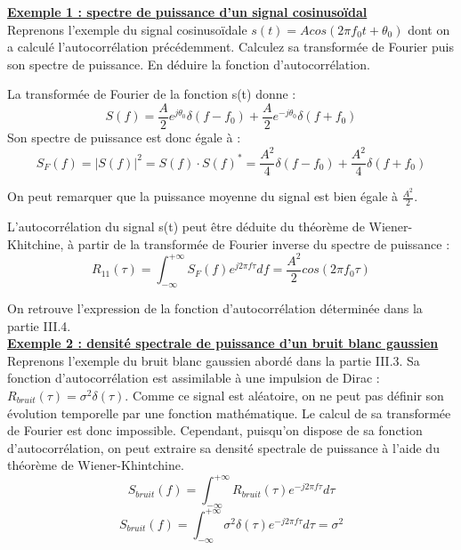 	
	\textbf{\underline{Exemple 1 : spectre de puissance d'un signal cosinusoïdal}} \\
	
	Reprenons l'exemple du signal cosinusoïdale $s(t)=Acos(2\pi f_{0}t+\theta_{0})$ dont on a calculé l'autocorrélation précédemment. Calculez sa transformée de Fourier puis son spectre de puissance. En déduire la fonction d'autocorrélation.
	
	La transformée de Fourier de la fonction s(t) donne :
	\begin{equation*}
	S(f) = \frac{A}{2}e^{j\theta_{0}}\delta(f-f_{0})+\frac{A}{2}e^{-j\theta_{0}}\delta(f+f_{0})
	\end{equation*}
	Son spectre de puissance est donc égale à :
	\begin{equation*}
	S_{F}(f)=|S(f)|^{2}=S(f) \cdot S(f)^{*}=\frac{A^{2}}{4}\delta(f-f_{0})+\frac{A^{2}}{4}\delta(f+f_{0})
	\end{equation*}
	
	On peut remarquer que la puissance moyenne du signal est bien égale à $\frac{A^{2}}{2}$.
	
	L'autocorrélation du signal s(t) peut être déduite du théorème de Wiener-Khitchine, à partir de la transformée de Fourier inverse du spectre de puissance :
	\begin{equation*}
	R_{11}(\tau)=\int_{-\infty}^{+\infty}S_{F}(f)e^{j2\pi f\tau}df=\frac{A^{2}}{2}cos(2\pi f_{0}\tau)
	\end{equation*}
	
	On retrouve l'expression de la fonction d'autocorrélation déterminée dans la partie III.4. \\
	
	
	\textbf{\underline{Exemple 2 : densité spectrale de puissance d'un bruit blanc gaussien}} \\
	
	Reprenons l'exemple du bruit blanc gaussien abordé dans la partie III.3. Sa fonction d'autocorrélation est assimilable à une impulsion de Dirac : $R_{bruit}(\tau) = \sigma^{2}\delta(\tau)$. Comme ce signal est aléatoire, on ne peut pas définir son évolution temporelle par une fonction mathématique. Le calcul de sa transformée de Fourier est donc impossible. Cependant, puisqu'on dispose de sa fonction d'autocorrélation, on peut extraire sa densité spectrale de puissance à l'aide du théorème de Wiener-Khintchine.
	\begin{equation}\label{}
	S_{bruit}(f)=	\int_{-\infty}^{+\infty}R_{bruit}(\tau)e^{-j2\pi f\tau}d\tau
	\end{equation}
	\begin{equation}\label{}
	S_{bruit}(f)=	\int_{-\infty}^{+\infty}\sigma^{2}\delta(\tau)e^{-j2\pi f\tau}d\tau=\sigma^{2}
	\end{equation}
	
